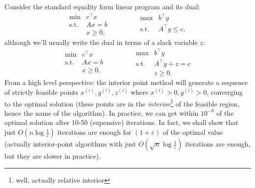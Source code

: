 \documentclass[11pt]{article}
\numberwithin{equation}{section}
\theoremstyle{definition}
\newcommand{\tst}{\text{s.t.}}
\begin{document}
Consider the standard equality form linear program and its dual:
\begin{equation}
    \begin{array}{cc}
         \min & c^\top x  \\
         \tst & Ax=b\\
              & x\ge 0,
    \end{array}\qquad\qquad
    \begin{array}{cc}
         \max & b^\top y  \\
         \tst & A^\top y\le c,\\
    \end{array}
\end{equation}
although we'll usually write the dual in terms of a slack variable $z$:
\begin{equation}
    \begin{array}{cc}
         \min & c^\top x  \\
         \tst & Ax=b\\
              & x\ge 0,
    \end{array}\qquad\qquad
    \begin{array}{cc}
         \max & b^\top y  \\
         \tst & A^\top y+z= c\\
              & z\ge 0.
    \end{array}
\end{equation}
From a high level perspective: the interior point method will generate a sequence of strictly feasible points $x^{(i)}, y^{(i)}, z^{(i)}$ where $x^{(i)}>0, y^{(i)}>0$, converging to the optimal solution (these points are in the \textit{interior}\footnote{well, actually relative interior} of the feasible region, hence the name of the algorithm). In practice, we can get within $10^{-8}$ of the optimal solution after 10-50 (expensive) iterations. In fact, we shall show that just $O( n\log{\frac1\varepsilon})$ iterations are enough for $(1+\varepsilon)$ of the optimal value (actually interior-point algorithms with just $O(\sqrt{n}\log{\frac1\varepsilon})$ iterations are enough, but they are slower in practice).
\end{document}
